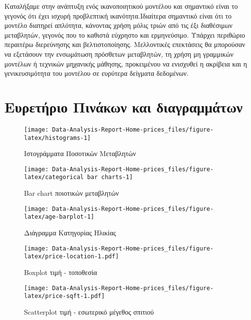 \documentclass[
  10pt,
]{article}
\begin{document}
Καταλήξαμε στην ανάπτυξη ενός ικανοποιητικού μοντέλου και σημαντικό
είναι το γεγονός ότι έχει ισχυρή προβλεπτική ικανότητα.Ιδιαίτερα
σημαντικό είναι ότι το μοντέλο διατηρεί απλότητα, κάνοντας χρήση μόλις
τριών από τις έξι διαθέσιμων μεταβλητών, γεγονός που το καθιστά εύχρηστο
και ερμηνεύσιμο. Υπάρχει περιθώριο περαιτέρω διερεύνησης και
βελτιστοποίησης. Μελλοντικές επεκτάσεις θα μπορούσαν να εξετάσουν την
ενσωμάτωση πρόσθετων μεταβλητών, τη χρήση μη γραμμικών μοντέλων ή
τεχνικών μηχανικής μάθησης, προκειμένου να ενισχυθεί η ακρίβεια και η
γενικευσιμότητα του μοντέλου σε ευρύτερα δείγματα δεδομένων.

\section*{Ευρετήριο Πινάκων και διαγραμμάτων}

\begin{figure}

{\centering \texttt{[image: Data-Analysis-Report-Home-prices\_files/figure-latex/histograms-1]} 

}

\caption{Ιστογράμματα Ποσοτικών Μεταβλητών}\label{fig:histograms}
\end{figure}

\begin{figure}

{\centering \texttt{[image: Data-Analysis-Report-Home-prices\_files/figure-latex/categorical bar charts-1]} 

}

\caption{Bar chart ποιοτικών μεταβλητών}\label{fig:categorical bar charts}
\end{figure}

\begin{figure}

{\centering \texttt{[image: Data-Analysis-Report-Home-prices\_files/figure-latex/age-barplot-1]} 

}

\caption{Διάγραμμα Κατηγορίας Ηλικίας}\label{fig:age-barplot}
\end{figure}

\begin{figure}
\centering
\texttt{[image: Data-Analysis-Report-Home-prices\_files/figure-latex/price-location-1.pdf]}
\caption{Boxplot τιμή - τοποθεσία}
\end{figure}

\begin{figure}
\centering
\texttt{[image: Data-Analysis-Report-Home-prices\_files/figure-latex/price-sqft-1.pdf]}
\caption{Scatterplot τιμή - εσωτερικό μέγεθος σπιτιού}
\end{figure}
\end{document}
